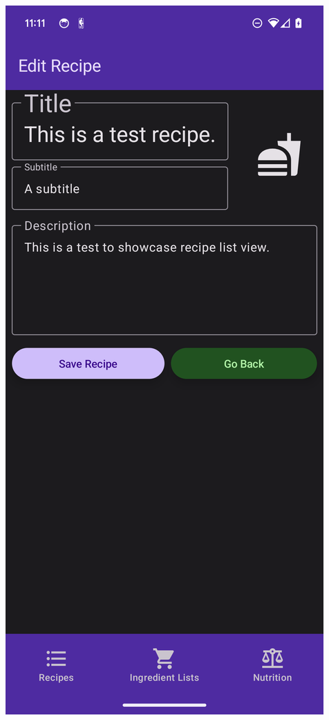 \documentclass[12pt]{article}
\begin{document}
\begin{center}
\includegraphics[scale=0.175]{../res/img/EditRecipeDark.png}

\end{center}
\end{document}
